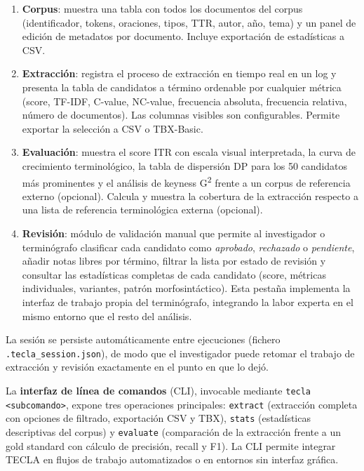 \begin{enumerate}
    \item \textbf{Corpus}: muestra una tabla con todos los documentos del corpus (identificador, tokens, oraciones, tipos, TTR, autor, año, tema) y un panel de edición de metadatos por documento. Incluye exportación de estadísticas a CSV.
    \item \textbf{Extracción}: registra el proceso de extracción en tiempo real en un log y presenta la tabla de candidatos a término ordenable por cualquier métrica (score, TF-IDF, C-value, NC-value, frecuencia absoluta, frecuencia relativa, número de documentos). Las columnas visibles son configurables. Permite exportar la selección a CSV o TBX-Basic.
    \item \textbf{Evaluación}: muestra el score ITR con escala visual interpretada, la curva de crecimiento terminológico, la tabla de dispersión DP para los 50 candidatos más prominentes y el análisis de keyness G\textsuperscript{2} frente a un corpus de referencia externo (opcional). Calcula y muestra la cobertura de la extracción respecto a una lista de referencia terminológica externa (opcional).
    \item \textbf{Revisión}: módulo de validación manual que permite al investigador o terminógrafo clasificar cada candidato como \textit{aprobado}, \textit{rechazado} o \textit{pendiente}, añadir notas libres por término, filtrar la lista por estado de revisión y consultar las estadísticas completas de cada candidato (score, métricas individuales, variantes, patrón morfosintáctico). Esta pestaña implementa la interfaz de trabajo propia del terminógrafo, integrando la labor experta en el mismo entorno que el resto del análisis.
\end{enumerate}

La sesión se persiste automáticamente entre ejecuciones (fichero \texttt{.tecla\_session.json}), de modo que el investigador puede retomar el trabajo de extracción y revisión exactamente en el punto en que lo dejó.

La \textbf{interfaz de línea de comandos} (CLI), invocable mediante \texttt{tecla <subcomando>}, expone tres operaciones principales: \texttt{extract} (extracción completa con opciones de filtrado, exportación CSV y TBX), \texttt{stats} (estadísticas descriptivas del corpus) y \texttt{evaluate} (comparación de la extracción frente a un gold standard con cálculo de precisión, recall y F1). La CLI permite integrar TECLA en flujos de trabajo automatizados o en entornos sin interfaz gráfica.

